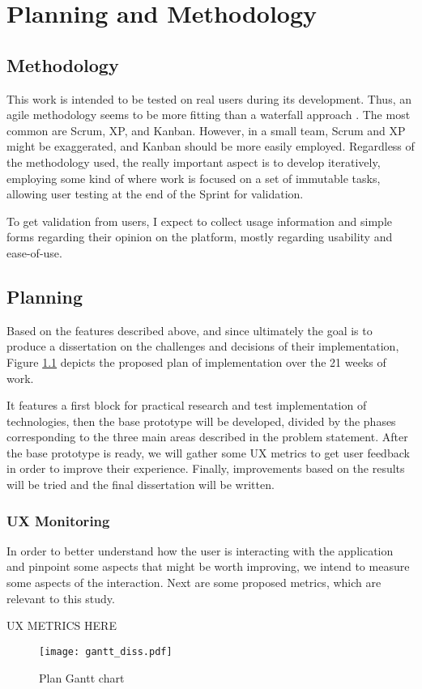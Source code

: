 \chapter{Planning and Methodology}\label{chap:problem-planning}

\section{Methodology}\label{sec:prob-methodology}

This work is intended to be tested on real users during its development. Thus, an agile methodology seems to be more fitting than a waterfall approach \cite{beck2001agile}. The most common are Scrum, XP, and Kanban. However, in a small team, Scrum and XP might be exaggerated, and Kanban should be more easily employed. Regardless of the methodology used, the really important aspect is to develop iteratively, employing some kind of  where work is focused on a set of immutable tasks, allowing user testing at the end of the Sprint for validation. 

To get validation from users, I expect to collect usage information and simple forms regarding their opinion on the platform, mostly regarding usability and ease-of-use. 

\section{Planning}\label{sec:prob-planning}

Based on the features described above, and since ultimately the goal is to produce a dissertation on the challenges and decisions of their implementation, Figure \ref{fig:gantt-plan} depicts the proposed plan of implementation over the 21 weeks of work.

It features a first block for practical research and test implementation of technologies, then the base prototype will be developed, divided by the phases corresponding to the three main areas described in the problem statement. After the base prototype is ready, we will gather some UX metrics to get user feedback in order to improve their experience. Finally, improvements based on the results will be tried and the final dissertation will be written.

\subsection{UX Monitoring}

In order to better understand how the user is interacting with the application and pinpoint some aspects that might be worth improving, we intend to measure some aspects of the interaction. Next are some proposed metrics, which are relevant to this study.

{\huge UX METRICS HERE}


\begin{landscape}
\begin{figure}
   \centering
    \texttt{[image: gantt\_diss.pdf]}
    \caption{Plan Gantt chart}
    \label{fig:gantt-plan}
\end{figure}
\end{landscape}
